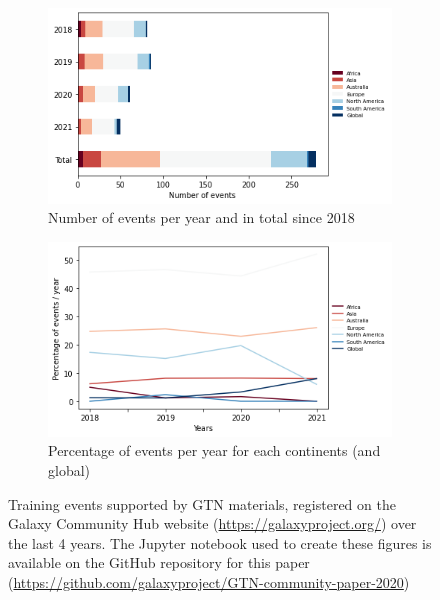 \documentclass[10pt,letterpaper]{article}
\begin{document}
\begin{figure}[!ht]
	\centering
	\begin{subfigure}[b]{0.45\textwidth}
         \centering
         \includegraphics[width=\textwidth]{images/hub-training-per-year.png}
    \caption{Number of events per year and in total since 2018}
         \label{fig:material-evolution}
    \end{subfigure}
    \hfill
    \begin{subfigure}[b]{0.45\textwidth}
         \centering
         \includegraphics[width=\textwidth]{images/hub-training-over-years.png}
         \caption{Percentage of events per year for each continents (and global)}
         \label{fig:material-number}
    \end{subfigure}
	\caption{Training events supported by GTN materials, registered on the Galaxy Community Hub website (\href{https://galaxyproject.org/}{https://galaxyproject.org/}) over the last 4 years. The Jupyter notebook used to create these figures is available on the GitHub repository for this paper (\url{https://github.com/galaxyproject/GTN-community-paper-2020}) \label{fig:hub-training}}
\end{figure}
\end{document}
